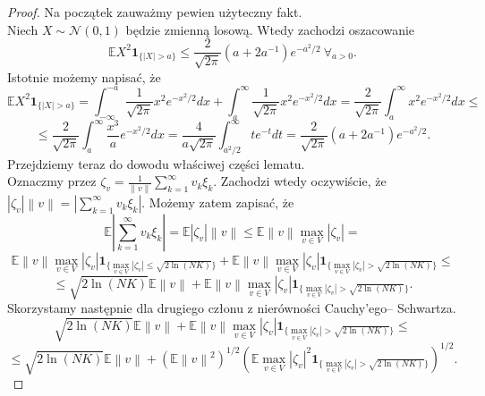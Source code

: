 \documentclass{article}
\newcommand{\norm}[1]{\left\lVert#1\right\rVert}
\begin{document}
\begin{proof}
Na początek zauważmy pewien użyteczny fakt.\\
Niech $X\sim \mathcal{N}(0,1)$ będzie zmienną losową. Wtedy zachodzi oszacowanie
\begin{displaymath}
\mathbb{E}X^2\pmb{1}_{\{|X|>a\}}\leq \frac{2}{\sqrt{2\pi}}(a+2a^{-1})e^{-a^2/2}\ \forall_{a>0}.
\end{displaymath}
Istotnie możemy napisać, że
\begin{displaymath}
\mathbb{E}X^2\pmb{1}_{\{|X|>a\}}=\int_{-\infty}^{-a}\frac{1}{\sqrt{2\pi}}x^2e^{-x^2/2}dx+\int_{a}^{\infty}\frac{1}{\sqrt{2\pi}}x^2e^{-x^2/2}dx=\frac{2}{\sqrt{2\pi}}\int_{a}^{\infty}x^2e^{-x^2/2}dx\leq
\end{displaymath}
\begin{displaymath}
\leq \frac{2}{\sqrt{2\pi}}\int_{a}^{\infty}\frac{x^3}{a}e^{-x^2/2}dx=\frac{4}{a\sqrt{2\pi}}\int_{a^2/2}^{\infty}te^{-t}dt=\frac{2}{\sqrt{2\pi}}(a+2a^{-1})e^{-a^2/2}.
\end{displaymath}
Przejdziemy teraz do dowodu właściwej części lematu.\\
Oznaczmy przez $\zeta_v=\frac{1}{\norm{v}}\sum_{k=1}^{\infty}v_k\xi_k$. Zachodzi wtedy oczywiście, że $|\zeta_v|\norm{v}=\left|\sum_{k=1}^{\infty}v_k\xi_k\right|$. Możemy zatem zapisać, że
\begin{displaymath}
\mathbb{E}\left|\sum_{k=1}^{\infty}v_k\xi_k\right|=\mathbb{E}|\zeta_v|\norm{v}\leq \mathbb{E}\norm{v}\max_{v\in V}|\zeta_v|=
\end{displaymath}
\begin{displaymath}
\mathbb{E}\norm{v}\max_{v\in V}|\zeta_v|\pmb{1}_{\{\max_{v\in V}|\zeta_v|\leq \sqrt{2\ln (NK)}\}}+\mathbb{E}\norm{v}\max_{v\in V}|\zeta_v|\pmb{1}_{\{\max_{v\in V}|\zeta_v|> \sqrt{2\ln (NK)}\}}\leq
\end{displaymath}
\begin{displaymath}
\leq \sqrt{2\ln (NK)}\mathbb{E}\norm{v}+\mathbb{E}\norm{v}\max_{v\in V}|\zeta_v|\pmb{1}_{\{\max_{v\in V}|\zeta_v|> \sqrt{2\ln (NK)}\}}.
\end{displaymath}
Skorzystamy następnie dla drugiego członu z nierówności Cauchy'ego-- Schwartza.
\begin{displaymath}
\sqrt{2\ln (NK)}\mathbb{E}\norm{v}+\mathbb{E}\norm{v}\max_{v\in V}|\zeta_v|\pmb{1}_{\{\max_{v\in V}|\zeta_v|> \sqrt{2\ln (NK)}\}}\leq 
\end{displaymath}
\begin{displaymath}
\leq \sqrt{2\ln (NK)}\mathbb{E}\norm{v}+\left(\mathbb{E}\norm{v}^2\right)^{1/2}\left(\mathbb{E}\max_{v\in V}|\zeta_v|^2\pmb{1}_{\{\max_{v\in V}|\zeta_v|> \sqrt{2\ln (NK)}\}}\right)^{1/2}.

\end{displaymath}
\end{proof}
\end{document}
